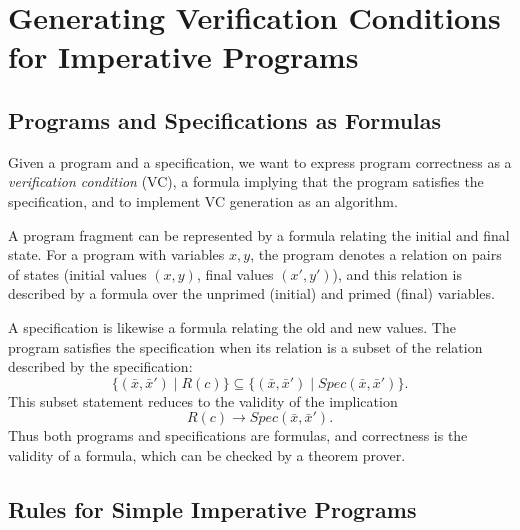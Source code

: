 % 
\chapter{Generating Verification Conditions for Imperative Programs}
 
\section{Programs and Specifications as Formulas}
 
Given a program and a specification, we want to express program correctness as a \emph{verification condition} (VC), a formula implying that the program satisfies the specification, and to implement VC generation as an algorithm.
 
A program fragment can be represented by a formula relating the initial and final state. For a program with variables $x, y$, the program denotes a relation on pairs of states (initial values $(x,y)$, final values $(x', y')$), and this relation is described by a formula over the unprimed (initial) and primed (final) variables.
 
A specification is likewise a formula relating the old and new values. The program satisfies the specification when its relation is a subset of the relation described by the specification:
\[
\{(\bar x, \bar x') \mid R(c)\} \subseteq \{(\bar x, \bar x') \mid \mathit{Spec}(\bar x, \bar x')\}.
\]
This subset statement reduces to the validity of the implication
\[
R(c) \rightarrow \mathit{Spec}(\bar x, \bar x').
\]
Thus both programs and specifications are formulas, and correctness is the validity of a formula, which can be checked by a theorem prover.
 
\section{Rules for Simple Imperative Programs}
 
 
